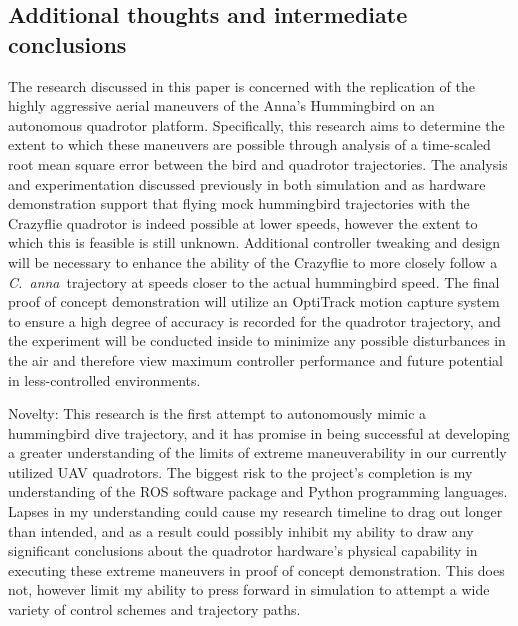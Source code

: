 \documentclass[onecolumn,10pt]{IEEEtran}
\newcommand{\Canna}{\emph{C.~anna}}
\begin{document}
\subsection{Additional thoughts and intermediate conclusions}
The research discussed in this paper is concerned with the replication of the highly aggressive aerial maneuvers of the Anna’s Hummingbird on an autonomous quadrotor platform. Specifically, this research aims to determine the extent to which these maneuvers are possible through analysis of a time-scaled root mean square error between the bird and quadrotor trajectories. The analysis and experimentation discussed previously in both simulation and as hardware demonstration support that flying mock hummingbird trajectories with the Crazyflie quadrotor is indeed possible at lower speeds, however the extent to which this is feasible is still unknown. Additional controller tweaking and design will be necessary to enhance the ability of the Crazyflie to more closely follow a \Canna\ trajectory at speeds closer to the actual hummingbird speed. The final proof of concept demonstration will utilize an OptiTrack motion capture system to ensure a high degree of accuracy is recorded for the quadrotor trajectory, and the experiment will be conducted inside to minimize any possible disturbances in the air and therefore view maximum controller performance and future potential in less-controlled environments. 

Novelty: This research is the first attempt to autonomously mimic a hummingbird dive trajectory, and it has promise in being successful at developing a greater understanding of the limits of extreme maneuverability in our currently utilized UAV quadrotors. The biggest risk to the project’s completion is my understanding of the ROS software package and Python programming languages. Lapses in my understanding could cause my research timeline to drag out longer than intended, and as a result could possibly inhibit my ability to draw any significant conclusions about the quadrotor hardware's physical capability in executing these extreme maneuvers in proof of concept demonstration. This does not, however limit my ability to press forward in simulation to attempt a wide variety of control schemes and trajectory paths.
\end{document}
